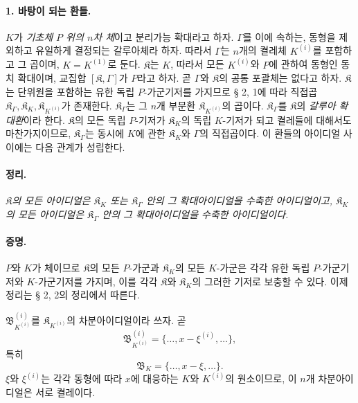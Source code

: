 \paragraph{1. 바탕이 되는 환들.}
\(K\)가 \emph{기초체 \(P\) 위의 \(n\)차 체}이고 분리가능 확대라고 하자. \(\Gamma\)를 이에 속하는, 동형을 제외하고 유일하게 결정되는 갈루아체라 하자. 따라서 \(\Gamma\)는 \(n\)개의 켤레체 \(K^{(i)}\)를 포함하고 그 곱이며, \(K=K^{(1)}\)로 둔다. \(\mathfrak K\)는 \(K\), 따라서 모든 \(K^{(i)}\)와 \(P\)에 관하여 동형인 동치 확대이며, 교집합 \([\mathfrak K,\Gamma]\)가 \(P\)라고 하자. 곧 \(\Gamma\)와 \(\mathfrak K\)의 공통 포괄체는 없다고 하자. \(\mathfrak K\)는 단위원을 포함하는 유한 독립 \(P\)-가군기저를 가지므로 § 2, 1에 따라 직접곱 \(\mathfrak K_\Gamma,\mathfrak K_K,\mathfrak K_{K^{(i)}}\)가 존재한다. \(\mathfrak K_\Gamma\)는 그 \(n\)개 부분환 \(\mathfrak K_{K^{(i)}}\)의 곱이다. \(\mathfrak K_\Gamma\)를 \(\mathfrak K\)의 \emph{갈루아 확대환}이라 한다. \(\mathfrak K\)의 모든 독립 \(P\)-기저가 \(\mathfrak K_K\)의 독립 \(K\)-기저가 되고 켤레들에 대해서도 마찬가지이므로, \(\mathfrak K_\Gamma\)는 동시에 \(K\)에 관한 \(\mathfrak K_K\)와 \(\Gamma\)의 직접곱이다. 이 환들의 아이디얼 사이에는 다음 관계가 성립한다.

\paragraph{정리.}
\emph{\(\mathfrak K\)의 모든 아이디얼은 \(\mathfrak K_K\) 또는 \(\mathfrak K_\Gamma\) 안의 그 확대아이디얼을 수축한 아이디얼이고, \(\mathfrak K_K\)의 모든 아이디얼은 \(\mathfrak K_\Gamma\) 안의 그 확대아이디얼을 수축한 아이디얼이다.}

\paragraph{증명.}
\(P\)와 \(K\)가 체이므로 \(\mathfrak K\)의 모든 \(P\)-가군과 \(\mathfrak K_K\)의 모든 \(K\)-가군은 각각 유한 독립 \(P\)-가군기저와 \(K\)-가군기저를 가지며, 이를 각각 \(\mathfrak K\)와 \(\mathfrak K_K\)의 그러한 기저로 보충할 수 있다. 이제 정리는 § 2, 2의 정리에서 따른다.

\(\mathfrak B_{K^{(i)}}^{(i)}\)를 \(\mathfrak K_{K^{(i)}}\)의 차분아이디얼이라 쓰자. 곧
\[
\mathfrak B_{K^{(i)}}^{(i)}=\{\ldots,x-\xi^{(i)},\ldots\},
\]
특히
\[
\mathfrak B_K=\{\ldots,x-\xi,\ldots\}.
\]
\(\xi\)와 \(\xi^{(i)}\)는 각각 동형에 따라 \(x\)에 대응하는 \(K\)와 \(K^{(i)}\)의 원소이므로, 이 \(n\)개 차분아이디얼은 서로 켤레이다.


